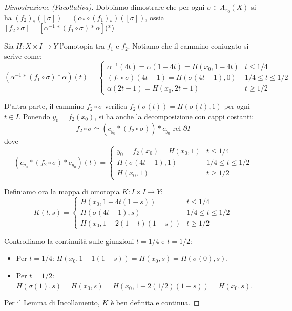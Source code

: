 \begin{proof}[Dimostrazione (Facoltativa)]
Dobbiamo dimostrare che per ogni $\sigma \in \Lambda_{x_0}(X)$ si ha $(f_2)_*([\sigma]) = (\alpha_* \circ (f_1)_*)([\sigma])$, ossia $[f_2 \circ \sigma] = [\alpha^{-1} * (f_1 \circ \sigma) * \alpha]$\hfill(*)

Sia $H: X \times I \to Y$ l'omotopia tra $f_1$ e $f_2$.
Notiamo che il cammino coniugato si scrive come:
\[
(\alpha^{-1} * (f_1 \circ \sigma) * \alpha)(t) = 
\begin{cases}
    \alpha^{-1}(4t) = \alpha(1-4t) = H(x_0, 1-4t) & t \leqslant 1/4 \\
    (f_1 \circ \sigma)(4t-1) = H(\sigma(4t-1), 0) & 1/4 \leqslant t \leqslant 1/2 \\
    \alpha(2t-1) = H(x_0, 2t-1) & t \geqslant 1/2
\end{cases}
\]

D'altra parte, il cammino $f_2 \circ \sigma$ verifica $f_2(\sigma(t)) = H(\sigma(t), 1)$ per ogni $t \in I$. Ponendo $y_0 = f_2(x_0)$, si ha anche la decomposizione con cappi costanti:
\[
f_2 \circ \sigma \simeq (c_{y_0} * (f_2 \circ \sigma)) * c_{y_0} \text{ rel } \partial I
\]
dove
\[
(c_{y_0} * (f_2 \circ \sigma) * c_{y_0})(t) = 
\begin{cases}
    y_0 = f_2(x_0) = H(x_0, 1) & t \leqslant 1/4 \\
    H(\sigma(4t-1), 1) & 1/4 \leqslant t \leqslant 1/2 \\
    H(x_0, 1) & t \geqslant 1/2
\end{cases}
\]

Definiamo ora la mappa di omotopia $K: I \times I \to Y$:
\[
K(t,s) = 
\begin{cases}
    H(x_0, 1 - 4t(1-s)) & t \leqslant 1/4 \\[0.5em]
    H(\sigma(4t-1), s) & 1/4 \leqslant t \leqslant 1/2 \\[0.5em]
    H(x_0, 1 - 2(1-t)(1-s)) & t \geqslant 1/2
\end{cases}
\]

Controlliamo la continuità sulle giunzioni $t = 1/4$ e $t = 1/2$:
\begin{itemize}
    \item Per $t = 1/4$: $H(x_0, 1 - 1(1-s)) = H(x_0, s) = H(\sigma(0), s)$.
    \item Per $t = 1/2$: $H(\sigma(1), s) = H(x_0, s) = H(x_0, 1 - 2(1/2)(1-s)) = H(x_0, s)$.
\end{itemize}
Per il Lemma di Incollamento, $K$ è ben definita e continua.


\end{proof}
